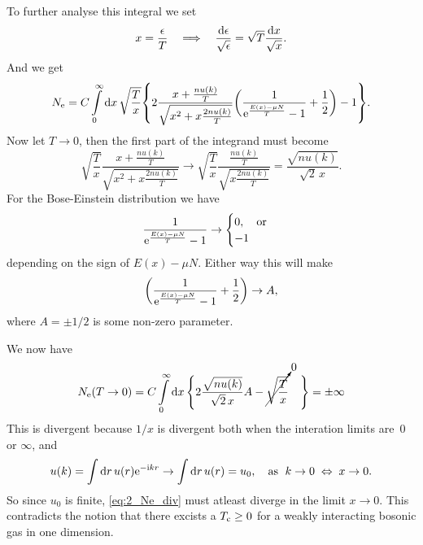 \documentclass[11pt,letter, swedish, english
]{article}
\begin{document}
To further analyse this integral we set
\begin{equation}
x=\frac{\epsilon}{T}
\quad\Longrightarrow\quad
\frac{\mathrm{d}\epsilon}{\sqrt{\epsilon}}
=\sqrt{T}\frac{\mathrm{d} x}{\sqrt{x}}.
\end{equation}
And we get
\begin{equation}\label{eq:2_Ne_int}
\Ne=C\int_0^\infty\rd{x}\,\sqrt{\frac{T}{x}}
\qty{
2\frac{x+\frac{nu(k)}{T}}{\sqrt{x^2+x\frac{2nu(k)}{T}}}
\qty(\frac{1}{\ee^{\frac{E(x)-\mu N}{T}}-1}+\frac{1}{2})-1
}.
\end{equation}
Now let $T\to0$, then the first part of the integrand must become
\begin{equation}\label{eq:2_lim1}
\sqrt{\frac{T}{x}}
\frac{x+\frac{nu(k)}{T}}{\sqrt{x^2+x\frac{2nu(k)}{T}}}
\to \sqrt{\frac{T}{x}}
\frac{\frac{nu(k)}{T}}{\sqrt{x\frac{2nu(k)}{T}}}
=\frac{\sqrt{nu(k)}}{\sqrt{2}\,x}.
\end{equation}
For the Bose-Einstein distribution we have
\begin{equation}
\frac{1}{\ee^{\frac{E(x)-\mu N}{T}}-1}\to
\begin{cases}
0\qcomma\text{or}\\
-1
\end{cases}
\end{equation}
depending on the sign of $E(x)-\mu N$. Either way this will make
\begin{equation}
\qty(\frac{1}{\mathrm{e}^{\frac{E(x)-\mu N}{T}}-1}+\frac{1}{2})\to A,
\end{equation}
where $A=\pm1/2$ is some non-zero parameter. 

We now have
\begin{equation}\label{eq:2_Ne_div}
\Ne(T\to0)=C\int_0^\infty\rd{x}\,
\Bigg\{
2\frac{\sqrt{nu(k)}}{\sqrt{2}\,x}A
-\cancelto{0}{\sqrt{\frac{T}{x}}} \phantom{00}\Bigg\}
=\pm\infty
\end{equation}
This is divergent because $1/x$ is divergent both when the interation
limits are~0 or $\infty$, and 
\begin{equation}
u(k)=\int\rd{r}\, u(r)\ee^{-\ii kr}
\to\int\rd{r}\, u(r) = u_0 
\qcomma \text{as }\; k\to0 \;\Leftrightarrow\; x\to0.
\end{equation}
So since $u_0$ is finite, \eqref{eq:2_Ne_div} must atleast diverge in
the limit $x\to 0$\footnotemark{}. This contradicts the notion that
there excists a $T_{\text{c}}\ge0$ for a weakly interacting bosonic gas in one
dimension. 
\end{document}

